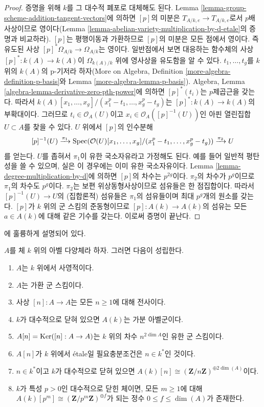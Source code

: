 \begin{proof}
증명을 위해 $k$를 그 대수적 폐포로 대체해도 된다. Lemma
\ref{lemma-group-scheme-addition-tangent-vectors}에 의하면 $[p]$의 미분은
$T_{A/k, e} \to T_{A/k, e}$로서 $p$배 사상이므로 영이다(Lemma
\ref{lemma-abelian-variety-multiplication-by-d-etale}의 증명과 비교하라). $[p]$는 평행이동과 가환하므로
$[p]$의 미분은 모든 점에서 영이다. 즉 유도된 사상
$[p]^*\Omega_{A/k} \to \Omega_{A/k}$는 영이다. 일반점에서 보면 대응하는 함수체의 사상
$[p]^* : k(A) \to k(A)$이 $\Omega_{k(A)/k}$ 위에 영사상을 유도함을 알 수 있다.
$t_1, \ldots, t_g$를 $k$ 위의 $k(A)$의 p-기저라 하자(More on Algebra, Definition
\ref{more-algebra-definition-p-basis}와 Lemma \ref{more-algebra-lemma-p-basis}). Algebra, Lemma
\ref{algebra-lemma-derivative-zero-pth-power}에 의하면 $[p]^*(t_i)$는 $p$제곱근을 갖는다. 따라서
$k(A)[x_1, \ldots, x_g]/(x_1^p - t_1, \ldots, x_g^p - t_g)$는 $[p]^* : k(A) \to k(A)$의 부확대이다.
그러므로 $t_i \in \mathcal{O}_A(U)$이고 $x_i \in \mathcal{O}_A([p]^{-1}(U))$인 아핀 열린집합 $U \subset A$를 찾을 수 있다.
$U$ 위에서 $[p]$의 인수분해
$$
[p]^{-1}(U)
\xrightarrow{\pi_1}
\mathop{\mathrm{Spec}}(\mathcal{O}(U)[x_1, \ldots, x_g]/(x_1^p - t_1, \ldots, x_g^p - t_g))
\xrightarrow{\pi_2}
U
$$
를 얻는다. $U$를 좁혀서 $\pi_1$이 유한 국소자유라고 가정해도 된다. 예를 들어 일반적 평탄성을 쓸 수 있으며,
실은 이 경우에는 이미 유한 국소자유이다. Lemma \ref{lemma-degree-multiplication-by-d}에 의하면
$[p]$의 차수는 $p^{2g}$이다. $\pi_2$의 차수가 $p^g$이므로 $\pi_1$의 차수도 $p^g$이다.
$\pi_2$는 보편 위상동형사상이므로 섬유들은 한 점집합이다. 따라서 $[p]^{-1}(U) \to U$의
(집합론적) 섬유들은 $\pi_1$의 섬유들이며 최대 $p^g$개의 원소를 갖는다. $[p]$가 $k$ 위의 군 스킴의
준동형이므로 $[p] : A(k) \to A(k)$의 섬유는 모든 $a \in A(k)$에 대해 같은 기수를 갖는다.
이로써 증명이 끝난다.
\end{proof}

\begin{proposition}
\label{proposition-review-abelian-varieties}
\begin{reference}
\cite{AVar}에 훌륭하게 설명되어 있다.
\end{reference}
$A$를 체 $k$ 위의 아벨 다양체라 하자. 그러면 다음이 성립한다.
\begin{enumerate}
\item $A$는 $k$ 위에서 사영적이다.
\item $A$는 가환 군 스킴이다.
\item 사상 $[n] : A \to A$는 모든 $n \geq 1$에 대해 전사이다.
\item $k$가 대수적으로 닫혀 있으면 $A(k)$는 가분 아벨군이다.
\item $A[n] = \mathop{\mathrm{Ker}}([n] : A \to A)$는 $k$ 위의 차수 $n^{2\dim A}$인 유한 군 스킴이다.
\item $A[n]$가 $k$ 위에서 \'etale일 필요충분조건은 $n \in k^*$인 것이다.
\item $n \in k^*$이고 $k$가 대수적으로 닫혀 있으면
$A(k)[n] \cong (\mathbf{Z}/n\mathbf{Z})^{\oplus 2\dim(A)}$이다.
\item $k$가 특성 $p > 0$인 대수적으로 닫힌 체이면, 모든 $m \geq 1$에 대해
$A(k)[p^m] \cong (\mathbf{Z}/p^m\mathbf{Z})^{\oplus f}$가 되는 정수
$0 \leq f \leq \dim(A)$가 존재한다.
\end{enumerate}
\end{proposition}

